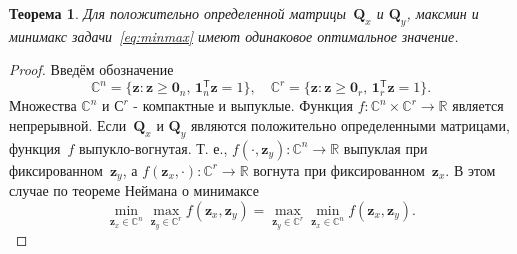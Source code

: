 \documentclass[preprint,12pt]{elsarticle}
\newtheorem{theorem}{Теорема}
\theoremstyle{definition}
\newcommand{\bz}{\mathbf{z}}
\newcommand{\bQ}{\mathbf{Q}}
\newcommand{\bbR}{\mathbb{R}}
\newcommand{\T}{\mathsf{T}}
\newcommand{\bOne}{\boldsymbol{1}}
\newcommand{\bZero}{\boldsymbol{0}}
\begin{document}
\begin{theorem}
    Для положительно определенной матрицы~$\bQ_x$ и $\bQ_y$, максмин и минимакс задачи~\eqref{eq:minmax} имеют одинаковое оптимальное значение.
\end{theorem}
\begin{proof}
    Введём обозначение
	\begin{equation*}
	\mathbb{C}^n = \{\bz : \bz \geq \bZero_n, \, \bOne_n^{\T}\bz=1\}, \quad \mathbb{C}^r = \{\bz : \bz \geq \bZero_r, \, \bOne_r^{\T}\bz=1\}.
	\end{equation*}
	Множества $\mathbb{C}^n$ и $\mathbb{С}^r$ - компактные и выпуклые. Функция $f: \mathbb{C}^n \times \mathbb{C}^r \rightarrow \bbR$ является непрерывной. Если~$\bQ_x$ и $\bQ_y$ являются положительно определенными матрицами, функция~$f$ выпукло-вогнутая. Т. е.,
	$f(\cdot, \bz_y): \mathbb{C}^n \rightarrow \bbR$ выпуклая при фиксированном~$\bz_y$, а $f(\bz_x, \cdot): \mathbb{C}^r \rightarrow \bbR$ вогнута при фиксированном~$\bz_x$.
	В этом случае по теореме Неймана о минимаксе
	\begin{equation*}
	\min_{\bz_x \in \mathbb{C}^n} \max_{\bz_y \in \mathbb{C}^r} f(\bz_x, \bz_y) = \max_{\bz_y \in \mathbb{C}^r} \min_{\bz_x\in \mathbb{C}^n} f(\bz_x, \bz_y).
	\end{equation*}
\end{proof}
\end{document}
